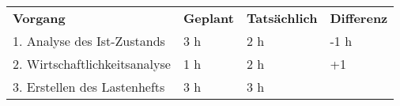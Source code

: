 \begin{tabularx}{\textwidth}{Xlll}
\rowcolor{heading}\textbf{Vorgang} & \textbf{Geplant} & \textbf{Tatsächlich} & \textbf{Differenz} \\
1. Analyse des Ist-Zustands & 3 h   & 2 h   & -1 h \\
\rowcolor{odd}2. Wirtschaftlichkeitsanalyse & 1 h   & 2 h   &  +1 \\
3. Erstellen des Lastenhefts & 3 h   & 3 h   &  \\
\end{tabularx}
